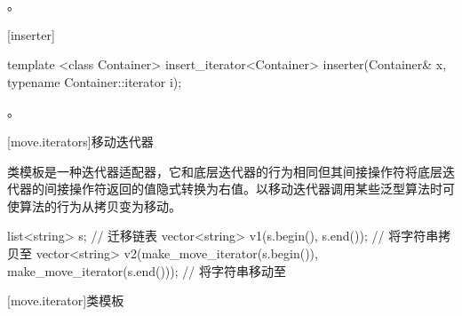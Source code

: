 \begin{itemdescr}
\pnum
\returns
{}。
\end{itemdescr}

[inserter]{}

%
\begin{itemdecl}
template <class Container>
  insert_iterator<Container> inserter(Container& x, typename Container::iterator i);
\end{itemdecl}

\begin{itemdescr}
\pnum
\returns
{}。
\end{itemdescr}

[move.iterators]{移动迭代器}

\pnum
类模板是一种迭代器适配器，它和底层迭代器的行为相同但其间接操作符将底层迭代器的间接操作符返回的值隐式转换为右值。以移动迭代器调用某些泛型算法时可使算法的行为从拷贝变为移动。

\pnum
\enterexample

\begin{codeblock}
list<string> s;
// 迁移链表
vector<string> v1(s.begin(), s.end());          // 将字符串拷贝至
vector<string> v2(make_move_iterator(s.begin()),
                  make_move_iterator(s.end())); // 将字符串移动至
\end{codeblock}

\exitexample

[move.iterator]{类模板}

